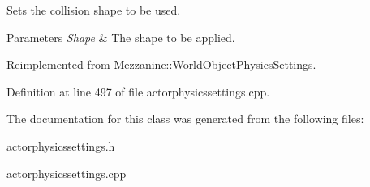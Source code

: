 Sets the collision shape to be used. 


\begin{DoxyParams}{Parameters}
{\em Shape} & The shape to be applied. \\
\hline
\end{DoxyParams}


Reimplemented from \hyperlink{classMezzanine_1_1WorldObjectPhysicsSettings_a23aaeac17f9631b59475991e02719499}{Mezzanine::WorldObjectPhysicsSettings}.



Definition at line 497 of file actorphysicssettings.cpp.



The documentation for this class was generated from the following files:\begin{DoxyCompactItemize}
\item 
actorphysicssettings.h\item 
actorphysicssettings.cpp\end{DoxyCompactItemize}
